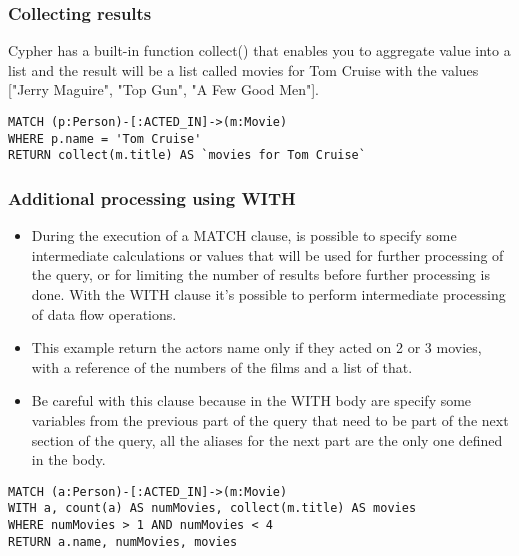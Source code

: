 \begin{frame}[fragile]\frametitle{Collecting results }

Cypher has a built-in function collect() that enables you to aggregate value into a list and the result will be a list called movies for Tom Cruise with the values ["Jerry Maguire", "Top Gun", "A Few Good Men"].

\begin{lstlisting}
MATCH (p:Person)-[:ACTED_IN]->(m:Movie)
WHERE p.name = 'Tom Cruise'
RETURN collect(m.title) AS `movies for Tom Cruise`
\end{lstlisting}


\end{frame}

\begin{frame}[fragile]\frametitle{Additional processing using WITH}

\begin{itemize}
\item During the execution of a MATCH clause, is possible to specify some intermediate calculations or values that will be used for further processing of the query, or for limiting the number of results before further processing is done. With the WITH clause it's possible to perform intermediate processing of data flow operations.
\item This example return the actors name only if they acted on 2 or 3 movies, with a reference of the numbers of the films and a list of that.
\item Be careful with this clause because in the WITH body are specify some variables from the previous part of the query that need to be part of the next section of the query, all the aliases for the next part are the only one defined in the body.
\end{itemize}

\begin{lstlisting}
MATCH (a:Person)-[:ACTED_IN]->(m:Movie)
WITH a, count(a) AS numMovies, collect(m.title) AS movies
WHERE numMovies > 1 AND numMovies < 4
RETURN a.name, numMovies, movies
\end{lstlisting}

\end{frame}

